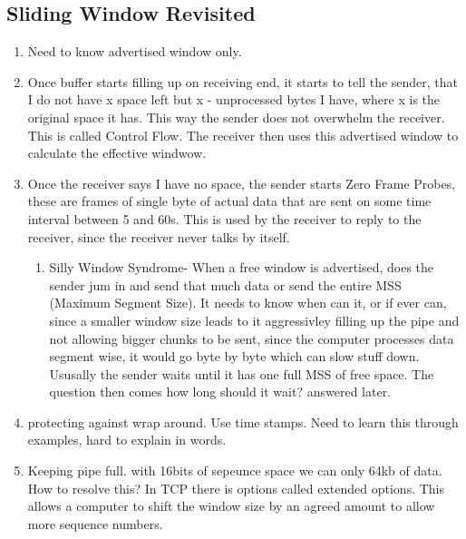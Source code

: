 \documentclass[12pt]{book}
\begin{document}
\subsection{Sliding Window Revisited}
\begin{enumerate}
    \item Need to know advertised window only.
    \item Once buffer starts filling up on receiving end, it starts to tell the sender, that I do not have x space left but x - unprocessed bytes I have, where x is the original space it has. This way the sender does not overwhelm the receiver. This is called Control Flow. The receiver then uses this advertised window to calculate the effective windwow.
    \item Once the receiver says I have no space, the sender starts Zero Frame Probes, these are frames of single byte of actual data that are sent on some time interval between 5 and 60s. This is used by the receiver to reply to the receiver, since the receiver never talks by itself.
    \begin{enumerate}
        \item Silly Window Syndrome- When a free window is advertised, does the sender jum in and send that much data or send the entire MSS (Maximum Segment Size). It needs to know when can it, or if ever can, since a smaller window size leads to it aggressivley filling up the pipe and not allowing bigger chunks to be sent, since the computer processes data segment wise, it would go byte by byte which can slow stuff down. Ususally the sender waits until it has one full MSS of free space. The question then comes how long should it wait? answered later.
    \end{enumerate}
    \item protecting against wrap around. Use time stamps. Need to learn this through examples, hard to explain in words.
    \item Keeping pipe full. with 16bits of sepeunce space we can only 64kb of data. How to resolve this? In TCP there is options called extended options. This allows a computer to shift the window size by an agreed amount to allow more sequence numbers.
\end{enumerate}
\end{document}
